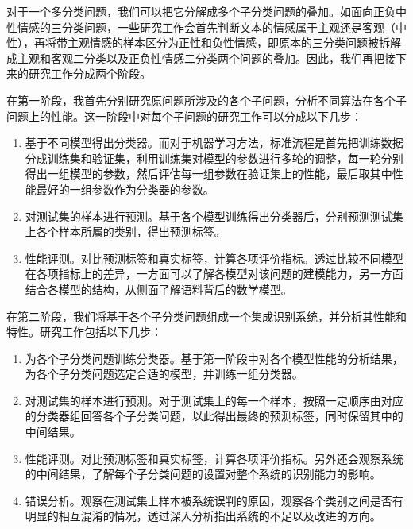 对于一个多分类问题，我们可以把它分解成多个子分类问题的叠加。如面向正负中性情感的三分类问题，一些研究工作会首先判断文本的情感属于主观还是客观（中性），再将带主观情感的样本区分为正性和负性情感，即原本的三分类问题被拆解成主观和客观二分类以及正负性情感二分类两个问题的叠加。因此，我们再把接下来的研究工作分成两个阶段。

在第一阶段，我首先分别研究原问题所涉及的各个子问题，分析不同算法在各个子问题上的性能。这一阶段中对每个子问题的研究工作可以分成以下几步：

\begin{enumerate}

\item 基于不同模型得出分类器。而对于机器学习方法，标准流程是首先把训练数据分成训练集和验证集，利用训练集对模型的参数进行多轮的调整，每一轮分别得出一组模型的参数，然后评估每一组参数在验证集上的性能，最后取其中性能最好的一组参数作为分类器的参数。

\item 对测试集的样本进行预测。基于各个模型训练得出分类器后，分别预测测试集上各个样本所属的类别，得出预测标签。

\item 性能评测。对比预测标签和真实标签，计算各项评价指标。透过比较不同模型在各项指标上的差异，一方面可以了解各模型对该问题的建模能力，另一方面结合各模型的结构，从侧面了解语料背后的数学模型。

\end{enumerate}

在第二阶段，我们将基于各个子分类问题组成一个集成识别系统，并分析其性能和特性。研究工作包括以下几步：

\begin{enumerate}

\item 为各个子分类问题训练分类器。基于第一阶段中对各个模型性能的分析结果，为各个子分类问题选定合适的模型，并训练一组分类器。

\item 对测试集的样本进行预测。对于测试集上的每一个样本，按照一定顺序由对应的分类器组回答各个子分类问题，以此得出最终的预测标签，同时保留其中的中间结果。

\item 性能评测。对比预测标签和真实标签，计算各项评价指标。另外还会观察系统的中间结果，了解每个子分类问题的设置对整个系统的识别能力的影响。

\item 错误分析。观察在测试集上样本被系统误判的原因，观察各个类别之间是否有明显的相互混淆的情况，透过深入分析指出系统的不足以及改进的方向。

\end{enumerate}

